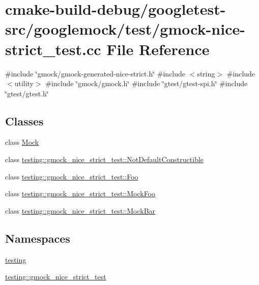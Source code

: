\hypertarget{gmock-nice-strict__test_8cc}{}\section{cmake-\/build-\/debug/googletest-\/src/googlemock/test/gmock-\/nice-\/strict\+\_\+test.cc File Reference}
\label{gmock-nice-strict__test_8cc}
{\ttfamily \#include \char`\"{}gmock/gmock-\/generated-\/nice-\/strict.\+h\char`\"{}}\newline
{\ttfamily \#include $<$string$>$}\newline
{\ttfamily \#include $<$utility$>$}\newline
{\ttfamily \#include \char`\"{}gmock/gmock.\+h\char`\"{}}\newline
{\ttfamily \#include \char`\"{}gtest/gtest-\/spi.\+h\char`\"{}}\newline
{\ttfamily \#include \char`\"{}gtest/gtest.\+h\char`\"{}}\newline
\subsection*{Classes}
\begin{DoxyCompactItemize}
\item 
class \mbox{\hyperlink{classMock}{Mock}}
\item 
class \mbox{\hyperlink{classtesting_1_1gmock__nice__strict__test_1_1NotDefaultConstructible}{testing\+::gmock\+\_\+nice\+\_\+strict\+\_\+test\+::\+Not\+Default\+Constructible}}
\item 
class \mbox{\hyperlink{classtesting_1_1gmock__nice__strict__test_1_1Foo}{testing\+::gmock\+\_\+nice\+\_\+strict\+\_\+test\+::\+Foo}}
\item 
class \mbox{\hyperlink{classtesting_1_1gmock__nice__strict__test_1_1MockFoo}{testing\+::gmock\+\_\+nice\+\_\+strict\+\_\+test\+::\+Mock\+Foo}}
\item 
class \mbox{\hyperlink{classtesting_1_1gmock__nice__strict__test_1_1MockBar}{testing\+::gmock\+\_\+nice\+\_\+strict\+\_\+test\+::\+Mock\+Bar}}
\end{DoxyCompactItemize}
\subsection*{Namespaces}
\begin{DoxyCompactItemize}
\item 
 \mbox{\hyperlink{namespacetesting}{testing}}
\item 
 \mbox{\hyperlink{namespacetesting_1_1gmock__nice__strict__test}{testing\+::gmock\+\_\+nice\+\_\+strict\+\_\+test}}
\end{DoxyCompactItemize}
